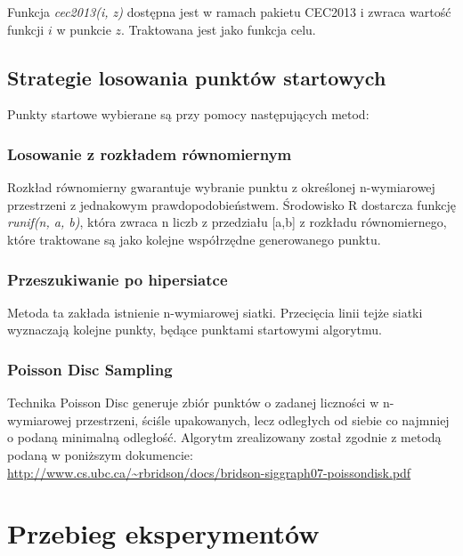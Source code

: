 \documentclass{article}
\begin{document}
Funkcja \textit{cec2013(i, z)} dostępna jest w ramach pakietu CEC2013 i zwraca wartość funkcji $i$ w punkcie $z$. Traktowana jest jako funkcja celu.


\subsection{Strategie losowania punktów startowych}
Punkty startowe wybierane są przy pomocy następujących metod:

\subsubsection{Losowanie z rozkładem równomiernym}
Rozkład równomierny gwarantuje wybranie punktu z określonej n-wymiarowej przestrzeni z jednakowym prawdopodobieństwem. Środowisko R dostarcza funkcję \textit{runif(n, a, b)}, która zwraca n liczb z przedziału [a,b] z rozkładu równomiernego, które traktowane są jako kolejne współrzędne generowanego punktu.

\subsubsection{Przeszukiwanie po hipersiatce}
Metoda ta zakłada istnienie n-wymiarowej siatki. Przecięcia linii tejże siatki wyznaczają kolejne punkty, będące punktami startowymi algorytmu.

\subsubsection{Poisson Disc Sampling}
Technika Poisson Disc generuje zbiór punktów o zadanej liczności w n-wymiarowej przestrzeni, ściśle upakowanych, lecz odległych od siebie co najmniej o podaną minimalną odległość. Algorytm zrealizowany został zgodnie z metodą podaną w poniższym dokumencie:\\
\url{http://www.cs.ubc.ca/~rbridson/docs/bridson-siggraph07-poissondisk.pdf}

\newpage
\section{Przebieg eksperymentów}
\end{document}
